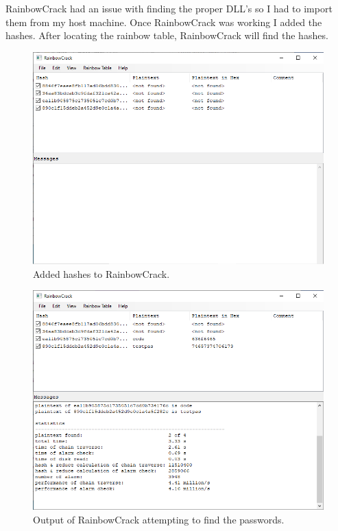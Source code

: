 RainbowCrack had an issue with finding the proper DLL's so I had to import them from my host machine.
Once RainbowCrack was working I added the hashes.
After locating the rainbow table, RainbowCrack will find the hashes.
\begin{figure}[H]
    \centering
    \includegraphics[width=\linewidth]{figures/5-add-hashes.png}
    \caption{Added hashes to RainbowCrack.}
\end{figure}
\begin{figure}[H]
    \centering
    \includegraphics[width=\linewidth]{figures/6-crack-hashes.png}
    \caption{Output of RainbowCrack attempting to find the passwords.}
\end{figure}

